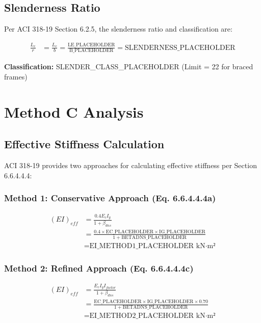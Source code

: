 \documentclass[
  10pt,
  letterpaper,
  twocolumn
]{article}
\begin{document}
\subsection{Slenderness Ratio}

Per ACI 318-19 Section 6.2.5, the slenderness ratio and classification are:

\begin{align}
\frac{L_e}{r} &= \frac{L_e}{b} = \frac{\text{LE_PLACEHOLDER}}{\text{B_PLACEHOLDER}} = \text{SLENDERNESS_PLACEHOLDER} \label{eq:slenderness}
\end{align}

\textbf{Classification:} SLENDER_CLASS_PLACEHOLDER (Limit = 22 for braced frames)

\section{Method C Analysis}

\subsection{Effective Stiffness Calculation}

ACI 318-19 provides two approaches for calculating effective stiffness per Section 6.6.4.4.4:

\subsubsection{Method 1: Conservative Approach (Eq. 6.6.4.4.4a)}

\begin{align}
(EI)_{eff} &= \frac{0.4 E_c I_g}{1 + \beta_{dns}} \label{eq:ei_method1} \\
&= \frac{0.4 \times \text{EC_PLACEHOLDER} \times \text{IG_PLACEHOLDER}}{1 + \text{BETADNS_PLACEHOLDER}} \\
&= \text{EI_METHOD1_PLACEHOLDER} \text{ kN·m²}
\end{align}

\subsubsection{Method 2: Refined Approach (Eq. 6.6.4.4.4c)}

\begin{align}
(EI)_{eff} &= \frac{E_c I_g I_{factor}}{1 + \beta_{dns}} \label{eq:ei_method2} \\
&= \frac{\text{EC_PLACEHOLDER} \times \text{IG_PLACEHOLDER} \times 0.70}{1 + \text{BETADNS_PLACEHOLDER}} \\
&= \text{EI_METHOD2_PLACEHOLDER} \text{ kN·m²}
\end{align}
\end{document}
